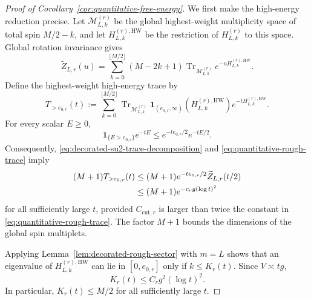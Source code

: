 \documentclass[11pt]{article}
\numberwithin{equation}{section}
\theoremstyle{remark}
\newcommand{\Tr}{\operatorname{Tr}}
\newcommand{\1}{\mathbf 1}
\newcommand{\HW}{\mathrm{HW}}
\begin{document}
\begin{proof}[Proof of Corollary~\ref{cor:quantitative-free-energy}]
We first make the high-energy reduction precise.  Let
\(\mathcal M_{L,k}^{(r)}\) be the global highest-weight multiplicity space
of total spin \(M/2-k\), and let \(H_{L,k}^{(r),\HW}\) be the restriction
of \(H_{L,k}^{(r)}\) to this space.  Global rotation invariance gives
\begin{equation}
 \widetilde Z_{L,r}(u)
 =\sum_{k=0}^{\lfloor M/2\rfloor}(M-2k+1)
 \Tr_{\mathcal M_{L,k}^{(r)}}e^{-uH_{L,k}^{(r),\HW}}.
 \label{eq:decorated-su2-trace-decomposition}
\end{equation}
Define the highest-weight high-energy trace by
\[
 T_{>e_{0,r}}(t):=
 \sum_{k=0}^{\lfloor M/2\rfloor}
 \Tr_{\mathcal M_{L,k}^{(r)}}
 \1_{(e_{0,r},\infty)}(H_{L,k}^{(r),\HW})
 e^{-tH_{L,k}^{(r),\HW}}.
\]
For every scalar \(E\geq0\),
\[
 \1_{\{E>e_{0,r}\}}e^{-tE}
 \leq e^{-te_{0,r}/2}e^{-tE/2}.
\]
Consequently, \eqref{eq:decorated-su2-trace-decomposition} and
\eqref{eq:quantitative-rough-trace} imply
\begin{align}
 (M+1)T_{>e_{0,r}}(t)
 &\leq(M+1)e^{-te_{0,r}/2}\widetilde Z_{L,r}(t/2)\notag\\
 &\leq(M+1)e^{-c_rg(\log t)^2}
 \label{eq:quantitative-high-energy-tail}
\end{align}
for all sufficiently large \(t\), provided \(C_{\mathrm{cut},r}\) is
larger than twice the constant in
\eqref{eq:quantitative-rough-trace}.  The factor \(M+1\) bounds the
dimensions of the global spin multiplets.

Applying Lemma~\ref{lem:decorated-rough-sector} with \(m=L\) shows that
an eigenvalue of \(H_{L,k}^{(r),\HW}\) can lie in \([0,e_{0,r}]\) only if
\(k\leq K_r(t)\).  Since \(V\asymp tg\),
\begin{equation}
 K_r(t)\leq C_rg^2(\log t)^2.
 \label{eq:quantitative-number-cutoff}
\end{equation}
In particular, \(K_r(t)\leq M/2\) for all sufficiently large \(t\).


\end{proof}
\end{document}
